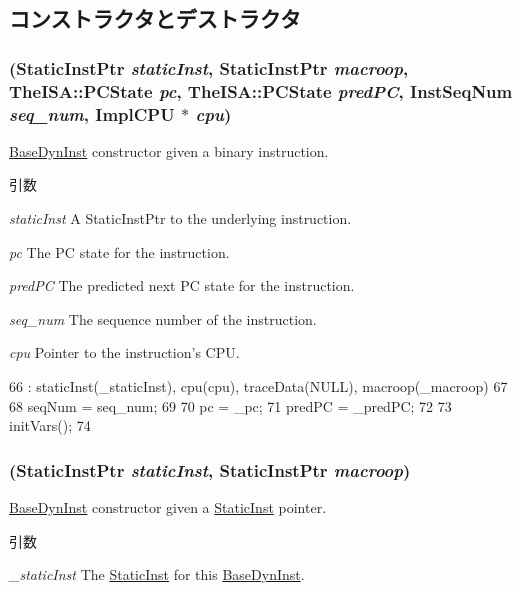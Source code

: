 \subsection{コンストラクタとデストラクタ}
\hypertarget{classBaseDynInst_a840565bb821f30293af92f0db4ddb28a}{
\subsubsection[{BaseDynInst}]{ ({\bf StaticInstPtr} {\em staticInst}, \/  {\bf StaticInstPtr} {\em macroop}, \/  TheISA::PCState {\em pc}, \/  TheISA::PCState {\em predPC}, \/  {\bf InstSeqNum} {\em seq\_\-num}, \/  {\bf ImplCPU} $\ast$ {\em cpu})}}
\label{classBaseDynInst_a840565bb821f30293af92f0db4ddb28a}
\hyperlink{classBaseDynInst}{BaseDynInst} constructor given a binary instruction. 
\begin{DoxyParams}{引数}
\item[{\em staticInst}]A StaticInstPtr to the underlying instruction. \item[{\em pc}]The PC state for the instruction. \item[{\em predPC}]The predicted next PC state for the instruction. \item[{\em seq\_\-num}]The sequence number of the instruction. \item[{\em cpu}]Pointer to the instruction's CPU. \end{DoxyParams}



\begin{DoxyCode}
66   : staticInst(_staticInst), cpu(cpu), traceData(NULL), macroop(_macroop)
67 {
68     seqNum = seq_num;
69 
70     pc = _pc;
71     predPC = _predPC;
72 
73     initVars();
74 }
\end{DoxyCode}
\hypertarget{classBaseDynInst_a7ebce8e9adfcd43b1e8b3a58f235d289}{
\subsubsection[{BaseDynInst}]{ ({\bf StaticInstPtr} {\em staticInst}, \/  {\bf StaticInstPtr} {\em macroop})}}
\label{classBaseDynInst_a7ebce8e9adfcd43b1e8b3a58f235d289}
\hyperlink{classBaseDynInst}{BaseDynInst} constructor given a \hyperlink{classStaticInst}{StaticInst} pointer. 
\begin{DoxyParams}{引数}
\item[{\em \_\-staticInst}]The \hyperlink{classStaticInst}{StaticInst} for this \hyperlink{classBaseDynInst}{BaseDynInst}. \end{DoxyParams}



